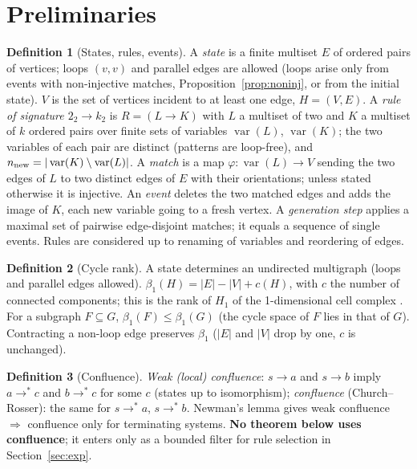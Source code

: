 \documentclass[10pt]{article}
\theoremstyle{definition}
\newtheorem{definition}{Definition}
\theoremstyle{plain}
\theoremstyle{remark}
\newcommand{\Betti}{\beta_1}
\DeclareMathOperator{\var}{var}
\begin{document}
\section{Preliminaries}\label{sec:prelim}
\begin{definition}[States, rules, events]\label{def:states}
A \emph{state} is a finite multiset $E$ of ordered pairs of vertices; loops $(v,v)$ and parallel edges are allowed (loops arise only from events with non-injective matches, Proposition~\ref{prop:noninj}, or from the initial state). $V$ is the set of vertices incident to at least one edge, $H=(V,E)$. A \emph{rule of signature $2_2\to k_2$} is $R=(L\to K)$ with $L$ a multiset of two and $K$ a multiset of $k$ ordered pairs over finite sets of variables $\var(L)$, $\var(K)$; the two variables of each pair are distinct (patterns are loop-free), and $n_{\rm new}=|\var(K)\setminus\var(L)|$. A \emph{match} is a map $\varphi:\var(L)\to V$ sending the two edges of $L$ to two distinct edges of $E$ with their orientations; unless stated otherwise it is injective. An \emph{event} deletes the two matched edges and adds the image of $K$, each new variable going to a fresh vertex. A \emph{generation step} applies a maximal set of pairwise edge-disjoint matches; it equals a sequence of single events. Rules are considered up to renaming of variables and reordering of edges.
\end{definition}

\begin{definition}[Cycle rank]
A state determines an undirected multigraph (loops and parallel edges allowed). $\Betti(H)=|E|-|V|+c(H)$, with $c$ the number of connected components; this is the rank of $H_1$ of the 1-dimensional cell complex \citep{hatcher2002}. For a subgraph $F\subseteq G$, $\Betti(F)\le\Betti(G)$ (the cycle space of $F$ lies in that of $G$). Contracting a non-loop edge preserves $\Betti$ ($|E|$ and $|V|$ drop by one, $c$ is unchanged).
\end{definition}

\begin{definition}[Confluence]
\emph{Weak (local) confluence}: $s\to a$ and $s\to b$ imply $a\to^*c$ and $b\to^*c$ for some $c$ (states up to isomorphism); \emph{confluence} (Church--Rosser): the same for $s\to^*a$, $s\to^*b$. Newman's lemma \citep{newman1942} gives weak confluence $\Rightarrow$ confluence only for terminating systems. \textbf{No theorem below uses confluence}; it enters only as a bounded filter for rule selection in Section~\ref{sec:exp}.
\end{definition}
\end{document}
